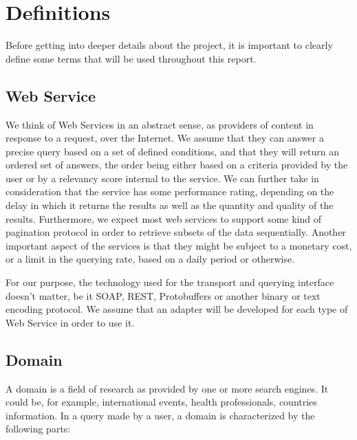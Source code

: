 \section{Definitions} %
\label{sec:definitions}

Before getting into deeper details about the project, it is important to clearly define some terms that will be used throughout this report.

\subsection{Web Service} %
\label{sub:web_service_def}

We think of Web Services in an abstract sense, as providers of content in response to a request, over the Internet. We assume that they can answer a precise query based on a set of defined conditions, and that they will return an ordered set of answers, the order being either based on a criteria provided by the user or by a relevancy score internal to the service. We can further take in consideration that the service has some performance rating, depending on the delay in which it returns the results as well as the quantity and quality of the results. Furthermore, we expect most web services to support some kind of pagination protocol in order to retrieve subsets of the data sequentially. Another important aspect of the services is that they might be subject to a monetary cost, or a limit in the querying rate, based on a daily period or otherwise.

For our purpose, the technology used for the transport and querying interface doesn't matter, be it SOAP, REST, Protobuffers or another binary or text encoding protocol. We assume that an adapter will be developed for each type of Web Service in order to use it.


\subsection{Domain} %
\label{sub:domain_def}

A domain is a field of research as provided by one or more search engines. It could be, for example, international events, health professionals, countries information. In a query made by a user, a domain is characterized by the following parts:

